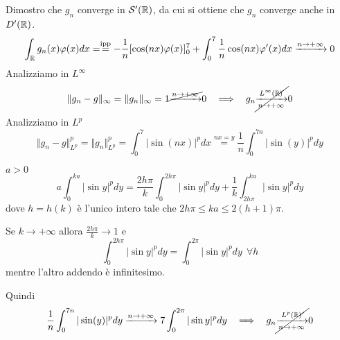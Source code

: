 Dimostro che $g_{n}$ converge in $\mathcal{S}  '(\mathbb{R})$, da cui si ottiene che $g_{n}$ converge anche in $D'(\mathbb{R})$.
\begin{equation*}
\int_{\mathbb{R}} g_{n}(x) \varphi (x) dx = \overset{\text{ipp}}{=} - \frac{1}{n}[\cos(nx) \varphi (x)]^{7}_{0} + \int^{7}_{0}\frac{1}{n}\cos(nx) \varphi '(x) dx\xrightarrow{n\rightarrow + \infty} 0
\end{equation*}
Analizziamo in $L^{\infty}$
\begin{equation*}
\Vert g_{n} - g\Vert_{\infty} = \Vert g_{n}\Vert_{\infty} = 1\cancel{\xrightarrow{n\rightarrow + \infty}} 0\ \ \implies \ \ g_{n}\cancel{\xrightarrow[n\rightarrow + \infty ]{L^{\infty}(\RR)}} 0
\end{equation*}
Analizziamo in $L^{p}$
\begin{equation*}
\Vert g_{n} - g\Vert^{p}_{L^{p}} = \Vert g_{n}\Vert^{p}_{L^{p}} = \int^{7}_{0}| \sin(nx)|^{p} dx\overset{nx = y}{=}\frac{1}{n}\int^{7n}_{0}| \sin(y)|^{p} dy
\end{equation*}
\begin{rem}
$a > 0$
\begin{equation*}
a\int^{ka}_{0}| \sin y|^{p} dy = \frac{2h\pi}{k}\int^{2h\pi}_{0}| \sin y|^{p} dy + \frac{1}{k}\int^{ka}_{2h\pi}| \sin y|^{p} dy
\end{equation*}
dove $h = h(k)$ è l'unico intero tale che $2h\pi \leq ka \leq 2(h + 1) \pi $.

Se $k\rightarrow + \infty $ allora $\frac{2h\pi}{k}\rightarrow 1$ e
\begin{equation*}
\int^{2h\pi}_{0}| \sin y|^{p} dy = \int^{2\pi}_{0}| \sin y|^{p} dy\ \ \forall h
\end{equation*}
mentre l'altro addendo è infinitesimo.
\end{rem}
Quindi
\begin{equation*}
\frac{1}{n}\int^{7n}_{0}| \sin(y)|^{p} dy\xrightarrow{n\rightarrow + \infty} 7\int^{2\pi}_{0}| \sin y|^{p} dy\ \ \implies \ \ g_{n}\cancel{\xrightarrow[n\rightarrow + \infty ]{L^{p}(\mathbb{R})}} 0
\end{equation*}
\Soluzione

